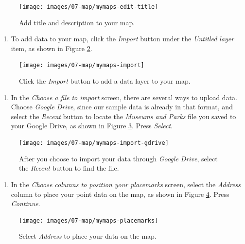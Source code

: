 \documentclass[
  english,
]{book}
\providecommand{\tightlist}{%
  \setlength{\itemsep}{0pt}\setlength{\parskip}{0pt}}
\begin{document}
\begin{figure}
\texttt{[image: images/07-map/mymaps-edit-title]} \caption{Add title and description to your map.}\label{fig:mymaps-edit-title}
\end{figure}

\begin{enumerate}
\def\labelenumi{\arabic{enumi}.}
\setcounter{enumi}{3}
\tightlist
\item
  To add data to your map, click the \emph{Import} button under the \emph{Untitled layer} item, as shown in Figure \ref{fig:mymaps-import}.
\end{enumerate}



\begin{figure}
\texttt{[image: images/07-map/mymaps-import]} \caption{Click the \emph{Import} button to add a data layer to your map.}\label{fig:mymaps-import}
\end{figure}

\begin{enumerate}
\def\labelenumi{\arabic{enumi}.}
\setcounter{enumi}{4}
\tightlist
\item
  In the \emph{Choose a file to import} screen, there are several ways to upload data. Choose \emph{Google Drive}, since our sample data is already in that format, and select the \emph{Recent} button to locate the \emph{Museums and Parks} file you saved to your Google Drive, as shown in Figure \ref{fig:mymaps-import-gdrive}. Press \emph{Select}.
\end{enumerate}



\begin{figure}
\texttt{[image: images/07-map/mymaps-import-gdrive]} \caption{After you choose to import your data through \emph{Google Drive}, select the \emph{Recent} button to find the file.}\label{fig:mymaps-import-gdrive}
\end{figure}

\begin{enumerate}
\def\labelenumi{\arabic{enumi}.}
\setcounter{enumi}{5}
\tightlist
\item
  In the \emph{Choose columns to position your placemarks} screen, select the \emph{Address} column to place your point data on the map, as shown in Figure \ref{fig:mymaps-placemarks}. Press \emph{Continue}.
\end{enumerate}



\begin{figure}
\texttt{[image: images/07-map/mymaps-placemarks]} \caption{Select \emph{Address} to place your data on the map.}\label{fig:mymaps-placemarks}
\end{figure}
\end{document}
